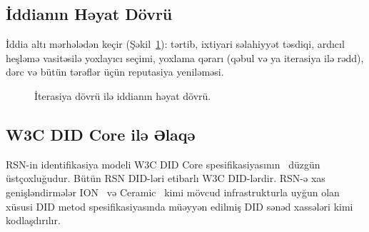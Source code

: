 \documentclass[11pt,a4paper,twocolumn]{article}
\begin{document}
\subsection{İddianın Həyat Dövrü}

İddia altı mərhələdən keçir (Şəkil~\ref{fig:lifecycle}): tərtib, ixtiyari səlahiyyət təsdiqi, ardıcıl heşləmə vasitəsilə yoxlayıcı seçimi, yoxlama qərarı (qəbul və ya iterasiya ilə rədd), dərc və bütün tərəflər üçün reputasiya yeniləməsi.

\begin{figure}[ht]
\centering
{}
\caption{İterasiya dövrü ilə iddianın həyat dövrü.}
\label{fig:lifecycle}
\end{figure}

\subsection{W3C DID Core ilə Əlaqə}

RSN-in identifikasiya modeli W3C DID Core spesifikasiyasının~\cite{did2022} düzgün üstçoxluğudur. Bütün RSN DID-ləri etibarlı W3C DID-lərdir. RSN-ə xas genişləndirmələr ION~\cite{buchner2021} və Ceramic~\cite{ceramic2023} kimi mövcud infrastrukturla uyğun olan xüsusi DID metod spesifikasiyasında müəyyən edilmiş DID sənəd xassələri kimi kodlaşdırılır.

\end{document}
